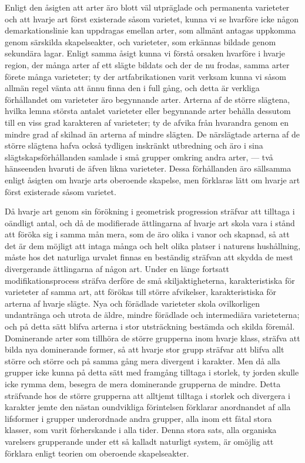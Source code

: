 Enligt den åsigten att arter äro blott väl utpräglade och permanenta varieteter och att hvarje art först existerade såsom varietet, kunna vi se hvarföre icke någon demarkationslinie kan uppdragas emellan arter, som allmänt antagas uppkomma genom särskilda skapelseakter, och varieteter, som erkännas bildade genom sekundära lagar. Enligt samma åsigt kunna vi förstå orsaken hvarföre i hvarje region, der många arter af ett slägte bildats och der de nu frodas, samma arter förete många varieteter; ty der artfabrikationen varit verksam kunna vi såsom allmän regel vänta att ännu finna den i full gång, och detta är verkliga förhållandet om varieteter äro begynnande arter. Arterna af de större slägtena, hvilka lemna största antalet varieteter eller begynnande arter behålla dessutom till en viss grad karakteren af varieteter; ty de afvika från hvarandra genom en mindre grad af skilnad än arterna af mindre slägten. De närslägtade arterna af de större slägtena hafva också tydligen inskränkt utbredning och äro i sina slägtskapsförhållanden samlade i små grupper omkring andra arter, — två hänseenden hvaruti de äfven likna varieteter. Dessa förhållanden äro sällsamma enligt åsigten om hvarje arts oberoende skapelse, men förklaras lätt om hvarje art först existerade såsom varietet.

Då hvarje art genom sin förökning i geometrisk progression sträfvar att tilltaga i oändligt antal, och då de modifierade ättlingarna af hvarje art skola vara i stånd att föröka sig i samma mån mera, som de äro olika i vanor och skapnad, så att det är dem möjligt att intaga många och helt olika platser i naturens hushållning, måste hos det naturliga urvalet finnas en beständig sträfvan att skydda de mest divergerande ättlingarna af någon art. Under en länge fortsatt modifikationsprocess sträfva derföre de små skiljaktigheterna, karakteristiska för varieteter af samma art, att förökas till större afvikelser, karakteristiska för arterna af hvarje slägte. Nya och förädlade varieteter skola ovilkorligen undantränga och utrota de äldre, mindre förädlade och intermediära varieteterna; och på detta sätt blifva arterna i stor utsträckning bestämda och skilda föremål. Dominerande arter som tillhöra de större grupperna inom hvarje klass, sträfva att bilda nya dominerande former, så att hvarje stor grupp sträfvar att blifva allt större och större och på samma gång mera divergent i karakter. Men då alla grupper icke kunna på detta sätt med framgång tilltaga i storlek, ty jorden skulle icke rymma dem, besegra de mera dominerande grupperna de mindre. Detta sträfvande hos de större grupperna att alltjemt tilltaga i storlek och divergera i karakter jemte den nästan oundvikliga förintelsen förklarar anordnandet af alla lifsformer i grupper underordnade andra grupper, alla inom ett fåtal stora klasser, som varit förherskande i alla tider. Denna stora sats, alla organiska varelsers grupperande under ett så kalladt naturligt system, är omöjlig att förklara enligt teorien om oberoende skapelseakter.

